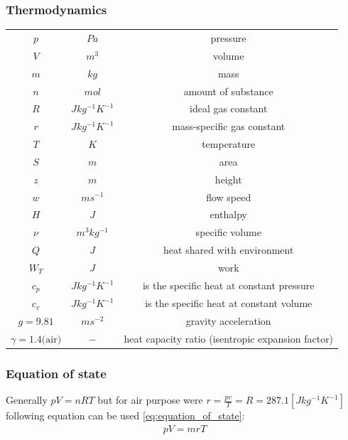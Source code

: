 \documentclass[class=article, crop=false]{standalone}
\begin{document}
\subsubsection{Thermodynamics}
\begin{tabular}{ |c|c|c| }
    \hline
    $p$                     & $Pa$              & pressure \\
    $V$                     & $m^3$             & volume \\
    $m$                     & $kg$              & mass \\
    $n$                     & $mol$             & amount of substance \\
    $R$                     & $Jkg^{-1}K^{-1}$  & ideal gas constant \\
    $r$                     & $Jkg^{-1}K^{-1}$  & mass-specific gas constant \\
    $T$                     & $K$               & temperature \\
    $S$                     & $m$               & area \\
    $z$                     & $m$               & height \\
    $w$                     & $ms^{-1}$         & flow speed \\
    $H$                     & $J$               & enthalpy \\
    $\nu$                   & $m^3kg^{-1}$      & specific volume \\
    $Q$                     & $J$               & heat shared with
                                                    environment \\
    $W_T$                   & $J$               & work \\
    $c_p$                   & $Jkg^{-1}K^{-1}$  & is the specific heat
                                                    at constant pressure \\
    $c_v$                   & $Jkg^{-1}K^{-1}$  & is the specific heat at constant volume\\
    $g=9.81$                & $ms^{-2}$         & gravity acceleration \\
    $\gamma=1.4\text{(air)}$& $-$               & heat capacity ratio
                                                    (isentropic expansion factor)\\
    \hline
\end{tabular}

\subsubsection{Equation of state}
Generally $pV=nRT$ but for air purpose were $r=\frac{pv}{T}=R=287.1 [Jkg^{-1}K^{-1}]$
following equation can be used \ref{eq:equation_of_state}:
\begin{align}
    pV = mrT
    \label{eq:equation_of_state}
\end{align} 
\end{document}
